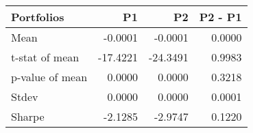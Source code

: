 \begin{tabular}{lrrr}
\toprule
Portfolios & P1 & P2 & P2 - P1 \\
\midrule
Mean & -0.0001 & -0.0001 & 0.0000 \\
t-stat of mean & -17.4221 & -24.3491 & 0.9983 \\
p-value of mean & 0.0000 & 0.0000 & 0.3218 \\
Stdev & 0.0000 & 0.0000 & 0.0001 \\
Sharpe & -2.1285 & -2.9747 & 0.1220 \\
\bottomrule
\end{tabular}
